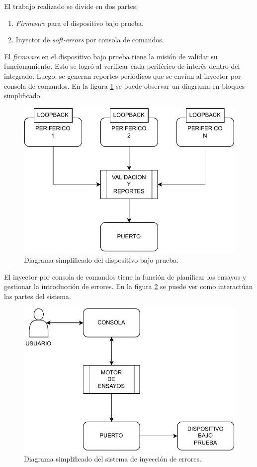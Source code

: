 El trabajo realizado se divide en dos partes:
\begin{enumerate}
    \item \emph{Firmware} para el dispositivo bajo prueba.
    \item Inyector de \emph{soft-errors} por consola de comandos.
\end{enumerate}

El \emph{firmware} en el dispositivo bajo prueba tiene la misión de validar su funcionamiento.
Esto se logró al verificar cada periférico de interés dentro del integrado.
Luego, se generan reportes periódicos que se envían al inyector por consola de comandos.
En la figura \ref{fig:dutsimple} se puede observar un diagrama en bloques simplificado.

\begin{figure}[htbp]
	\centering
	\includegraphics[width=\textwidth]{./Figures/dutsimple.pdf}
    \caption{Diagrama simplificado del dispositivo bajo prueba.}
	\label{fig:dutsimple}
\end{figure}

El inyector por consola de comandos tiene la función de planificar los ensayos y gestionar la introducción de errores.
En la figura \ref{fig:sisesimple} se puede ver como interactúan las partes del sistema.

\begin{figure}[htbp]
	\centering
	\includegraphics[width=\textwidth]{./Figures/sisesimple.pdf}
    \caption{Diagrama simplificado del sistema de inyección de errores.}
	\label{fig:sisesimple}
\end{figure}

